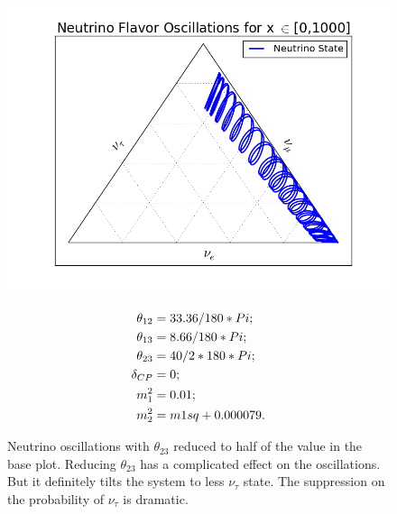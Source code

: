 \documentclass[letterpaper,12pt,english]{sphinxmanual}
\begin{document}
\begin{figure}[htbp]
\centering
\capstart

\includegraphics{1000-4.png}
\caption{Neutrino oscillations with \(\theta_{23}\) reduced to half of the value in the base plot. Reducing \(\theta_{23}\) has a complicated effect on the oscillations. But it definitely tilts the system to less \(\nu_\tau\) state. The suppression on the probability of \(\nu_\tau\) is dramatic.}{\small \begin{gather}
\begin{split}\theta_{12} &= 33.36/180*Pi; \\
\theta_{13} &= 8.66/ 180 *Pi; \\
\theta_{23} &= 40/ 2* 180*Pi;\\
\delta_{CP} &= 0;\\
m_1^2 &= 0.01;\\
m_2^2 &= m1sq + 0.000079.\end{split}\notag
\end{gather}}\end{figure}
\end{document}
